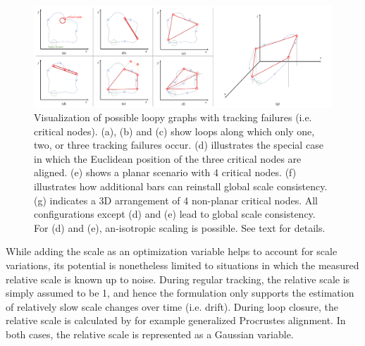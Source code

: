 \documentclass[letterpaper, 10 pt, conference]{ieeeconf}  %
\begin{document}
\begin{figure}[t]
    \centering
    \includegraphics[width=\textwidth]{cases.pdf}
    \caption{Visualization of possible loopy graphs with tracking failures (i.e. critical nodes). (a), (b) and (c) show loops along which only one, two, or three tracking failures occur. (d) illustrates the special case in which the Euclidean position of the three critical nodes are aligned. (e) shows a planar scenario with 4 critical nodes. (f) illustrates how additional bars can reinstall global scale consistency. (g) indicates a 3D arrangement of 4 non-planar critical nodes. All configurations except (d) and (e) lead to global scale consistency. For (d) and (e), an-isotropic scaling is possible. See text for details.}
    \label{fig:cases}
\end{figure}

While adding the scale as an optimization variable helps to account for scale variations, its potential is nonetheless limited to situations in which the measured relative scale is known up to noise. During regular tracking, the relative scale is simply assumed to be 1, and hence the formulation only supports the estimation of relatively slow scale changes over time (i.e. drift). During loop closure, the relative scale is calculated by for example generalized Procrustes alignment. In both cases, the relative scale is represented as a Gaussian variable.
\end{document}
